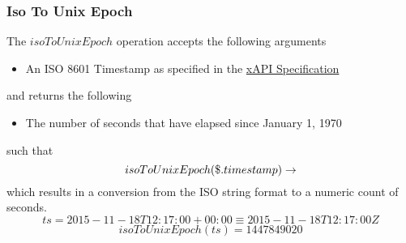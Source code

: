 \documentclass[../main.tex]{subfiles}
\begin{document}
\subsubsection{Iso To Unix Epoch}
The $isoToUnixEpoch$ operation accepts the following arguments

\begin{itemize}
\item An ISO 8601 Timestamp as specified in the \href{https://github.com/adlnet/xAPI-Spec/blob/master/xAPI-Data.md#timestamps}{xAPI Specification}
\end{itemize}
and returns the following
\begin{itemize}
\item The number of seconds that have elapsed since January 1, 1970
\end{itemize}
such that
$$isoToUnixEpoch(\$.timestamp) \to \real$$
which results in a conversion from the ISO string format to a numeric count of seconds.
$$ts = 2015-11-18T12:17:00+00:00 \equiv 2015-11-18T12:17:00Z$$
$$isoToUnixEpoch(ts) =  1447849020$$
\end{document}
